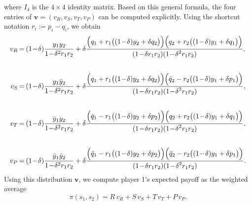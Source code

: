 \documentclass[11pt]{article}
\def\strategy{s}
\theoremstyle{plainCl1}
\theoremstyle{plainCl2}
\begin{document}
where $I_4$ is the $4\times4$ identity matrix. 
Based on this general formula, the four entries of $\mathbf{v}=(v_R, v_S, v_T, v_P)$ can be computed explicitly. 
Using the shortcut notation $r_i:=p_i\!-\!q_i$, we obtain
    \begin{equation} \label{Eq:vAverage}
      \setlength{\arraycolsep}{1pt}
      \begin{array}{rcl}    
      v_{R} &= &\displaystyle (1\!-\!\delta)\frac{y_1y_2}{1\!-\!\delta^2 r_1 r_2}+\delta \frac{\Big(q_1+r_1\big((1\!-\!\delta)y_2+\delta q_2\big)\Big) \Big(q_2+r_2\big((1\!-\!\delta)y_1+\delta q_1\big)\Big)}
      {\displaystyle(1\!-\!\delta r_1r_2)(1\!-\!\delta^2 r_1 r_2)},\\[1cm]
      v_{S}&= &\displaystyle (1\!-\!\delta)\frac{y_1\bar{y}_2}{1\!-\!\delta^2 r_1 r_2}+\delta \frac{\Big(q_1+r_1\big((1\!-\!\delta)y_2+\delta q_2\big)\Big) \Big(\bar{q}_2-r_2\big((1\!-\!\delta)y_1+\delta p_1\big)\Big)}
      {\displaystyle(1\!-\!\delta r_1r_2)(1\!-\!\delta^2 r_1 r_2)},\\[1cm]
      v_{T} &= &\displaystyle (1\!-\!\delta)\frac{\bar{y}_1y_2}{1\!-\!\delta^2 r_1 r_2}+\delta \frac{\Big(\bar{q}_1-r_1\big((1\!-\!\delta)y_2+\delta p_2\big)\Big) \Big(q_2+r_2\big((1\!-\!\delta)y_1+\delta q_1\big)\Big)}
      {\displaystyle(1\!-\!\delta r_1r_2)(1\!-\!\delta^2 r_1 r_2)},\\[1cm]
      v_{P} &= &\displaystyle (1\!-\!\delta)\frac{\bar{y}_1\bar{y}_2}{1\!-\!\delta^2 r_1 r_2}+\delta \frac{\Big(\bar{q}_1-r_1\big((1\!-\!\delta)y_2+\delta p_2\big)\Big) \Big(\bar{q}_2-r_2\big((1\!-\!\delta)y_1+\delta p_1\big)\Big)}
      {\displaystyle(1\!-\!\delta r_1r_2)(1\!-\!\delta^2 r_1 r_2)}.
      \end{array}
    \end{equation}
Using this distribution $\mathbf{v}$, we compute player 1's expected payoff as the weighted average
\begin{equation}
\pi(\strategy_1,\strategy_2) = R \, v_R + S\,v_S + T\,v_T + P\,v_P. 
\end{equation}

\end{document}
